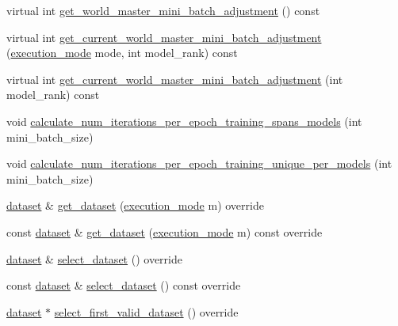 \begin{DoxyCompactItemize}
\item 
virtual int \hyperlink{classlbann_1_1generic__input__layer_a111abcde5f53746dfd6c5fe18187ee57}{get\+\_\+world\+\_\+master\+\_\+mini\+\_\+batch\+\_\+adjustment} () const
\item 
virtual int \hyperlink{classlbann_1_1generic__input__layer_a8c3bf45beb91622d56f0dec89cba8e9a}{get\+\_\+current\+\_\+world\+\_\+master\+\_\+mini\+\_\+batch\+\_\+adjustment} (\hyperlink{base_8hpp_a2781a159088df64ed7d47cc91c4dc0a8}{execution\+\_\+mode} mode, int model\+\_\+rank) const
\item 
virtual int \hyperlink{classlbann_1_1generic__input__layer_a6c14ea2a50c7e7989e8e394671e4531a}{get\+\_\+current\+\_\+world\+\_\+master\+\_\+mini\+\_\+batch\+\_\+adjustment} (int model\+\_\+rank) const
\item 
void \hyperlink{classlbann_1_1generic__input__layer_af108a5dc05276bc6bc57b306204b12e4}{calculate\+\_\+num\+\_\+iterations\+\_\+per\+\_\+epoch\+\_\+training\+\_\+spans\+\_\+models} (int mini\+\_\+batch\+\_\+size)
\item 
void \hyperlink{classlbann_1_1generic__input__layer_a0f09422a09e76da77ac42b3037173041}{calculate\+\_\+num\+\_\+iterations\+\_\+per\+\_\+epoch\+\_\+training\+\_\+unique\+\_\+per\+\_\+models} (int mini\+\_\+batch\+\_\+size)
\item 
\hyperlink{classlbann_1_1dataset}{dataset} \& \hyperlink{classlbann_1_1generic__input__layer_af5699540797c22d8846028e578a6fc59}{get\+\_\+dataset} (\hyperlink{base_8hpp_a2781a159088df64ed7d47cc91c4dc0a8}{execution\+\_\+mode} m) override
\item 
const \hyperlink{classlbann_1_1dataset}{dataset} \& \hyperlink{classlbann_1_1generic__input__layer_a909cf972d13a305a16daba9664180262}{get\+\_\+dataset} (\hyperlink{base_8hpp_a2781a159088df64ed7d47cc91c4dc0a8}{execution\+\_\+mode} m) const override
\item 
\hyperlink{classlbann_1_1dataset}{dataset} \& \hyperlink{classlbann_1_1generic__input__layer_a654365ee97a64c75a547cfb7ef329304}{select\+\_\+dataset} () override
\item 
const \hyperlink{classlbann_1_1dataset}{dataset} \& \hyperlink{classlbann_1_1generic__input__layer_ab8468d077867b03098bbc71a38edaa15}{select\+\_\+dataset} () const override
\item 
\hyperlink{classlbann_1_1dataset}{dataset} $\ast$ \hyperlink{classlbann_1_1generic__input__layer_a777aa11816a518098212408b569b6fb8}{select\+\_\+first\+\_\+valid\+\_\+dataset} () override
\item 

\end{DoxyCompactItemize}
